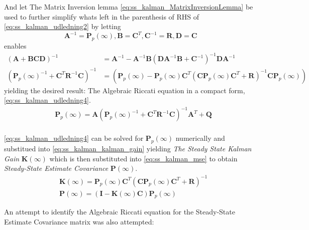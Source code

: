 And let The Matrix Inversion lemma \cref{eq:ss_kalman_MatrixInversionLemma} be used to further simplify whats left in the parenthesis of RHS of \cref{eq:ss_kalman_udledning2} by letting
\begin{equation}
		\textbf{A}^{-1} = \textbf{P}_p(\infty), \textbf{B} = \textbf{C}^T, \textbf{C}^{-1} = \textbf{R}, \textbf{D} = \textbf{C} \label{eq:ss_kalman_udledning3}
\end{equation}
enables 
\begin{align}
		(\textbf{A}+\textbf{BCD})^{-1} &= \textbf{A}^{-1} - \textbf{A}^{-1}\textbf{B} (\textbf{D}\textbf{A}^{-1}\textbf{B}+\textbf{C}^{-1})^{-1}\textbf{D}\textbf{A}^{-1} \\ \label{eq:ss_kalman_MatrixInversionLemma}
		(\textbf{P}_p(\infty)^{-1} + \textbf{C}^T \textbf{R}^{-1} \textbf{C})^{-1} &= (\textbf{P}_p(\infty) - \textbf{P}_p(\infty) \textbf{C}^T (\textbf{C} \textbf{P}_p(\infty) \textbf{C}^T + \textbf{R})^{-1} \textbf{C} \textbf{P}_p(\infty))
\end{align}
yielding the desired result: The Algebraic Riccati equation in a compact form, \cref{eq:ss_kalman_udledning4}.
\begin{equation}
	\begin{split}\label{eq:ss_kalman_udledning4}
		&\textbf{P}_p(\infty) = \textbf{A} (\textbf{P}_p(\infty)^{-1} + \textbf{C}^T \textbf{R}^{-1} \textbf{C})^{-1} \textbf{A}^T + \textbf{Q}\\
	\end{split}
\end{equation}

\cref{eq:ss_kalman_udledning4} can be solved for $\textbf{P}_p(\infty)$ numerically and substitued into \cref{eq:ss_kalman_kalman_gain} yielding \textit{The Steady State Kalman Gain} $ \textbf{K}(\infty) $ which is then substituted into \cref{eq:ss_kalman_mse} to obtain \textit{Steady-State Estimate Covariance} $ \textbf{P}(\infty) $.
\begin{align}
	& \textbf{K}(\infty) = \textbf{P}_p(\infty) \textbf{C}^T (\textbf{C} \textbf{P}_p	(\infty) \textbf{C}^T + \textbf{R})^{-1} \label{eq:ss_kalman_kalman_gain1} \\
	& \textbf{P}(\infty) = (\textbf{I} - \textbf{K}(\infty) \textbf{C}) \textbf{P}_p(\infty) \label{eq:ss_kalman_mse1} 
\end{align}

An attempt to identify the Algebraic Riccati equation for the Steady-State Estimate Covariance matrix was also attempted:


